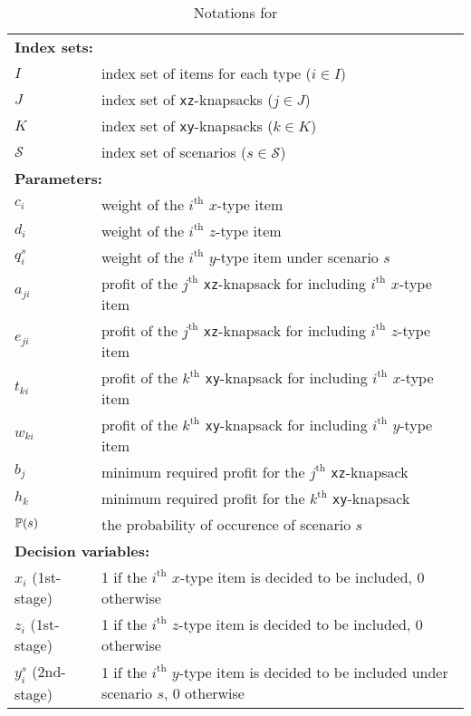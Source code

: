 \begin{table}[H]
	\caption{Notations for \smkp}
	\label{smkp:notation}
	\resizebox{\textwidth}{!}
	{
		\begin{tabular}{ll}
			\toprule
			\multicolumn{2}{l}{\textbf{Index sets:}} \\
			$I$ &  index set of items for each type ($i\in I$)\\ 
			$J$ &  index set of \texttt{xz}-knapsacks ($j \in J$)\\ 
			$K$ &  index set of \texttt{xy}-knapsacks ($k \in K$)\\
			$\mathcal{S}$ & index set of scenarios ($s\in \mathcal{S}$)\\ \midrule
			\multicolumn{2}{l}{\textbf{Parameters:}} \\
			$c_{i}$ 	& weight of the $i^{\mathrm{th}}$ $x$-type item 		\\ 
			$d_{i}$ 	& weight of the $i^{\mathrm{th}}$ $z$-type item  		\\ 
			$q_{i}^{s}$ & weight of the $i^{\mathrm{th}}$ $y$-type item under scenario $s$ 		\\ 
			$a_{ji}$	& profit of the $j^{\mathrm{th}}$ \texttt{xz}-knapsack for including $i^{\mathrm{th}}$ $x$-type item		\\
			$e_{ji}$	& profit of the $j^{\mathrm{th}}$ \texttt{xz}-knapsack for including $i^{\mathrm{th}}$ $z$-type item		\\
			$t_{ki}$	& profit of the $k^{\mathrm{th}}$ \texttt{xy}-knapsack for including $i^{\mathrm{th}}$ $x$-type item	\\
			$w_{ki}$	& profit of the $k^{\mathrm{th}}$ \texttt{xy}-knapsack for including $i^{\mathrm{th}}$ $y$-type item		\\
			$b_j$		& minimum required profit for the $j^{\mathrm{th}}$ \texttt{xz}-knapsack		\\
			$h_k$		& minimum required profit for the $k^{\mathrm{th}}$ \texttt{xy}-knapsack		\\
			$\operatorname*{\mathbb{P}}(s)$ 	& \textrm{the probability of occurence of scenario $s$} \\ \midrule
			\multicolumn{2}{l}{\textbf{Decision variables:}} \\
			$x_{i}$ (1st-stage) & 1 if the $i^{\mathrm{th}}$ $x$-type item is decided to be included, 0 otherwise \\ 
			$z_{i}$ (1st-stage) & 1 if the $i^{\mathrm{th}}$ $z$-type item is decided to be included, 0 otherwise \\ 
			$y_{i}^s$ (2nd-stage)& 1 if the $i^{\mathrm{th}}$ $y$-type item is decided to be included under scenario $s$, 0 otherwise  \\
			\bottomrule
		\end{tabular}
	}
\end{table} 

